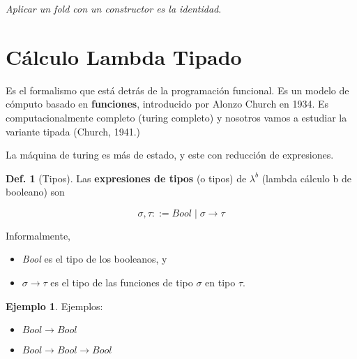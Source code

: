 \documentclass{report}
\theoremstyle{definition} %
\newtheorem{definition}{Def.}[chapter]
\newtheorem*{example*}{Ejemplo}
\newcommand{\lambdab}{\lambda^b}
\newcommand{\tfunc}[2]{#1 \to #2}
\begin{document}
\textit{Aplicar un fold con un constructor es la identidad}.

\section{Cálculo Lambda Tipado}

Es el formalismo que está detrás de la programación funcional. Es un modelo de
cómputo basado en \textbf{funciones}, introducido por Alonzo Church en 1934. Es
computacionalmente completo (turing completo) y nosotros vamos a estudiar la
variante tipada (Church, 1941.)

La máquina de turing es más de estado, y este con reducción de expresiones.

\begin{definition}[Tipos]\label{sec:func-lambdab-tipos}
    Las \textbf{expresiones de tipos} (o tipos) de $\lambdab$ (lambda cálculo b
    de booleano) son

    \[
        \sigma, \tau ::= Bool \mid \tfunc{\sigma}{\tau}
    \]

    Informalmente, 
    
    \begin{itemize}
        \item \textit{Bool} es el tipo de los booleanos, y
        \item $\tfunc{\sigma}{\tau}$ es el tipo de las funciones de tipo $\sigma$ en tipo $\tau$.
    \end{itemize}

    \begin{example*}
        Ejemplos:
        \begin{itemize}
            \item $\tfunc{Bool}{Bool}$
            \item $\tfunc{\tfunc{Bool}{Bool}}{Bool}$
        \end{itemize}
    \end{example*}
\end{definition}
\end{document}
